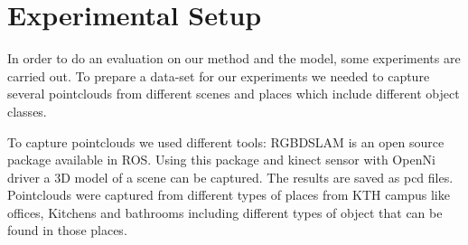 % 
% 
%  
% 
% 
% 
% 
% 


\section{Experimental Setup}
\label{ExperimentalSetup.sec}
In order to do an evaluation on our method and the model, some experiments are carried out.
To prepare a data-set for our experiments we needed to capture several pointclouds from different scenes and places which 
include different object classes.


To capture pointclouds we used different tools:
RGBDSLAM \cite{RGBDSLAM} is an open source  package available in ROS. 
Using this package and kinect sensor with OpenNi driver a 3D model of a scene can be captured. 
The results are saved as pcd files.
Pointclouds were captured from different types of places from KTH campus like offices, Kitchens and bathrooms including 
different types of object that can be found in those places.

